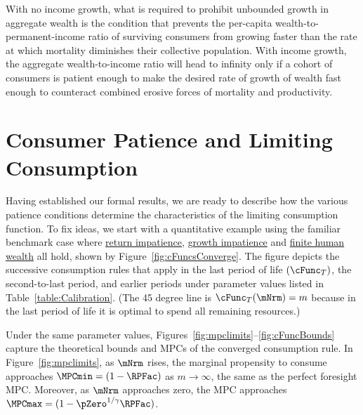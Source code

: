 \documentclass[BufferStockTheory]{subfiles}
\begin{document}
With no income growth, what is required to prohibit unbounded growth in aggregate wealth is the condition that prevents the per-capita wealth-to-permanent-income ratio of surviving consumers from growing faster than the rate at which mortality diminishes their collective population.
With income growth, the aggregate wealth-to-income ratio will head to infinity only if a cohort of consumers is patient enough to make the desired rate of growth of wealth fast enough to counteract combined erosive forces of mortality and productivity.

\hypertarget{Discussion-Growth-Impatience}{}
\section{Consumer Patience and Limiting Consumption}\label{sec:GICdiscussion}

\renewcommand{\figName}{cFuncsConverge} 
 

Having established our formal results, we are ready to describe how the various patience conditions determine the characteristics of the limiting consumption function.
To fix ideas, we start with a quantitative example using the familiar benchmark case where \hyperlink{RIC}{return impatience}, \hyperlink{GIC}{growth impatience} and \hyperlink{FHWC}{finite human wealth} all hold, shown by Figure~\ref{fig:cFuncsConverge}.
The figure depicts the successive consumption rules that apply in the last period of life $(\cFunc_{T})$, the second-to-last period, and earlier periods under parameter values listed in Table~\ref{table:Calibration}.
(The 45 degree line is $\cFunc_{T}(\mNrm) = m$ because in the last period of life it is optimal to spend all remaining resources.)

Under the same parameter values, Figures~\ref{fig:mpclimits}--\ref{fig:cFuncBounds} capture the theoretical bounds and MPCs of the converged consumption rule.
In Figure~\ref{fig:mpclimits}, as $\mNrm$ rises, the marginal propensity to consume approaches $\MPCmin=(1-\RPFac)$ as $m \rightarrow \infty$, the same as the perfect foresight MPC.
Moreover, as $\mNrm$ approaches zero, the MPC approaches $\MPCmax=(1-\pZero^{1/\CRRA}\RPFac)$.


\renewcommand{\figFile}{mpclimits}
\hypertarget{\figFile}{}


\renewcommand{\figFile}{cFuncBounds}
\hypertarget{\figFile}{}

\end{document}
